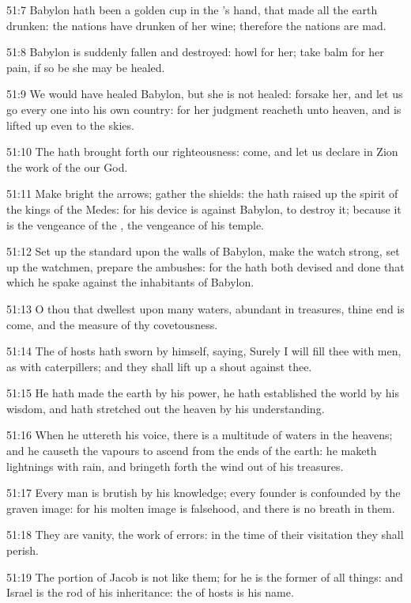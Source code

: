 51:7 Babylon hath been a golden cup in the \LORD's hand, that made all
the earth drunken: the nations have drunken of her wine; therefore the
nations are mad.

51:8 Babylon is suddenly fallen and destroyed: howl for her; take balm
for her pain, if so be she may be healed.

51:9 We would have healed Babylon, but she is not healed: forsake her,
and let us go every one into his own country: for her judgment
reacheth unto heaven, and is lifted up even to the skies.

51:10 The \LORD hath brought forth our righteousness: come, and let us
declare in Zion the work of the \LORD our God.

51:11 Make bright the arrows; gather the shields: the \LORD hath raised
up the spirit of the kings of the Medes: for his device is against
Babylon, to destroy it; because it is the vengeance of the \LORD, the
vengeance of his temple.

51:12 Set up the standard upon the walls of Babylon, make the watch
strong, set up the watchmen, prepare the ambushes: for the \LORD hath
both devised and done that which he spake against the inhabitants of
Babylon.

51:13 O thou that dwellest upon many waters, abundant in treasures,
thine end is come, and the measure of thy covetousness.

51:14 The \LORD of hosts hath sworn by himself, saying, Surely I will
fill thee with men, as with caterpillers; and they shall lift up a
shout against thee.

51:15 He hath made the earth by his power, he hath established the
world by his wisdom, and hath stretched out the heaven by his
understanding.

51:16 When he uttereth his voice, there is a multitude of waters in
the heavens; and he causeth the vapours to ascend from the ends of the
earth: he maketh lightnings with rain, and bringeth forth the wind out
of his treasures.

51:17 Every man is brutish by his knowledge; every founder is
confounded by the graven image: for his molten image is falsehood, and
there is no breath in them.

51:18 They are vanity, the work of errors: in the time of their
visitation they shall perish.

51:19 The portion of Jacob is not like them; for he is the former of
all things: and Israel is the rod of his inheritance: the \LORD of
hosts is his name.

